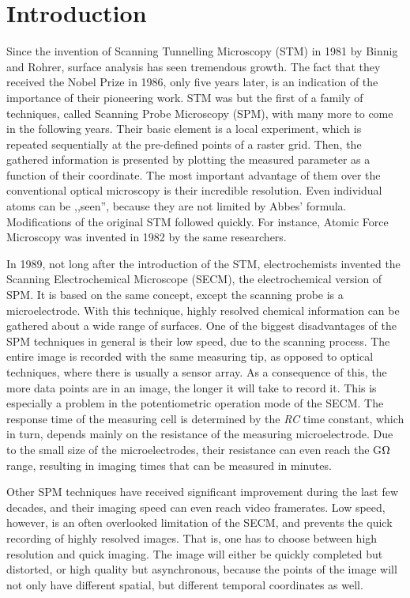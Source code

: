 \section{Introduction}
Since the invention of Scanning Tunnelling Microscopy (STM) in 1981 by Binnig and Rohrer, surface analysis has seen tremendous growth.
The fact that they received the Nobel Prize in 1986, only five years later, is an indication of the importance of their pioneering work.
STM was but the first of a family of techniques, called Scanning Probe Microscopy (SPM), with many more to come in the following years.
Their basic element is a local experiment, which is repeated sequentially at the pre-defined points of a raster grid.
Then, the gathered information is presented by plotting the measured parameter as a function of their coordinate.
The most important advantage of them over the conventional optical microscopy is their incredible resolution.
Even individual atoms can be ,,seen'', because they are not limited by Abbes' formula.
Modifications of the original STM followed quickly.
For instance, Atomic Force Microscopy was invented in 1982 by the same researchers.

In 1989, not long after the introduction of the STM, electrochemists invented the Scanning Electrochemical Microscope (SECM), the electrochemical version of SPM.
It is based on the same concept, except the scanning probe is a microelectrode.
With this technique, highly resolved chemical information can be gathered about a wide range of surfaces.
One of the biggest disadvantages of the SPM techniques in general is their low speed, due to the scanning process.
The entire image is recorded with the same measuring tip, as opposed to optical techniques, where there is usually a sensor array.
As a consequence of this, the more data points are in an image, the longer it will take to record it.
This is especially a problem in the potentiometric operation mode of the SECM.
The response time of the measuring cell is determined by the \emph{RC} time constant, which in turn, depends mainly on the resistance of the measuring microelectrode.
Due to the small size of the microelectrodes, their resistance can even reach the G$\ohm$ range, resulting in imaging times that can be measured in minutes.

Other SPM techniques have received significant improvement during the last few decades, and their imaging speed can even reach video framerates.
Low speed, however, is an often overlooked limitation of the SECM, and prevents the quick recording of highly resolved images.
That is, one has to choose between high resolution and quick imaging.
The image will either be quickly completed but distorted, or high quality but asynchronous, because the points of the image will not only have different spatial, but different temporal coordinates as well.

